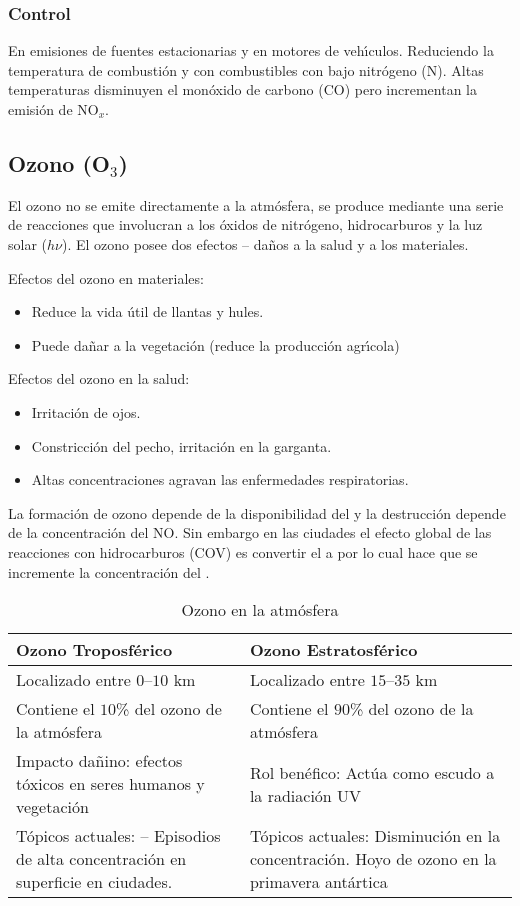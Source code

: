 \subsubsection{Control} En emisiones de fuentes estacionarias y en motores de veh\'{\i}culos. Reduciendo la temperatura de combusti\'on y con combustibles con bajo nitrógeno (N). Altas temperaturas disminuyen el monóxido de carbono (CO) pero incrementan la emisión de  NO$_x$.

\subsection{Ozono (O$_3$)}\label{o3_salud}
El ozono no se emite directamente a la atm\'osfera, se produce mediante una serie de reacciones que involucran a los \'oxidos de nitr\'ogeno, hidrocarburos y la luz solar ($h\nu$). El ozono posee dos efectos -- da\~nos a la salud y a los materiales.

Efectos del ozono en materiales:
\begin{itemize}
\item Reduce la vida \'util de llantas y hules.
\item Puede da\~nar a la vegetaci\'on (reduce la producci\'on agr\'{\i}cola)
\end{itemize}
Efectos del ozono en la salud:
\begin{itemize}
\item Irritaci\'on de ojos.
\item Constricci\'on del pecho, irritaci\'on en la garganta.
\item Altas concentraciones agravan las enfermedades respiratorias.
\end{itemize}
La  formaci\'on de ozono depende de la disponibilidad del   y la destrucci\'on depende de la concentraci\'on del NO. Sin embargo en las ciudades el efecto global de las reacciones con hidrocarburos (COV) es convertir el  a  por lo cual hace que se incremente la concentración del .

\begin{table}[hbt]
\caption{Ozono en la atm\'osfera}
\label{ozon:1}
\begin{center}
{\footnotesize \begin{tabularx}{.9\textwidth}{X|X}
\textbf{Ozono Troposf\'erico}&\textbf{Ozono Estratosf\'erico}\\ \hline \hline
Localizado entre $0$--$10$ km& Localizado entre $15$--$35$ km\\
Contiene el $10$\% del ozono de la atm\'osfera&
Contiene el $90$\% del ozono de la atm\'osfera\\
Impacto da\~nino: efectos t\'oxicos en seres humanos y vegetaci\'on&
Rol ben\'efico: Act\'ua como escudo a la radiaci\'on UV\\
T\'opicos actuales: -- Episodios de alta concentraci\'on en superficie en ciudades.&
T\'opicos actuales: Disminuci\'on en la concentraci\'on. Hoyo de ozono en la
primavera ant\'artica\\\hline
\end{tabularx}}
\end{center}
\end{table}

